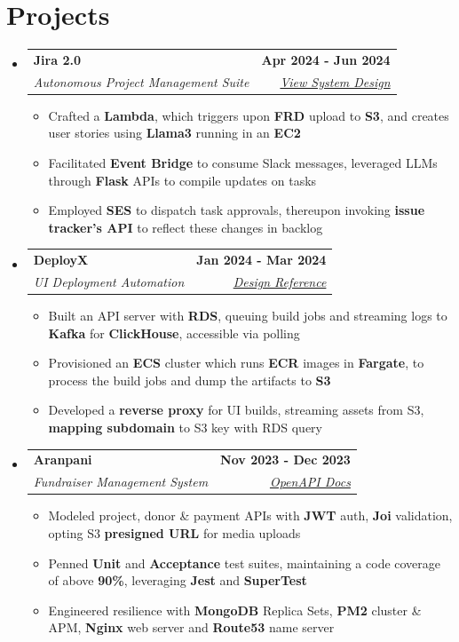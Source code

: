 \documentclass[letterpaper,11pt]{article}
\makeatletter
\newcommand{\resumeItem}[1]{
  \item\small{
    {#1 \vspace{-2pt}}
  }
}
\newcommand{\resumeSubheading}[4]{
  \vspace{-2pt}\item
    \begin{tabular*}{1.0\textwidth}[t]{l@{\extracolsep{\fill}}r}
      \textbf{#1} & \textbf{\small #2} \\
      \textit{\small#3} & \textit{\small #4} \\
    \end{tabular*}\vspace{-7pt}
}
\newcommand{\resumeSubHeadingListStart}{\begin{itemize}[leftmargin=0.0in, label={}]}
\newcommand{\resumeSubHeadingListEnd}{\end{itemize}}
\newcommand{\resumeItemListStart}{\begin{itemize}}
\newcommand{\resumeItemListEnd}{\end{itemize}\vspace{-5pt}}
\makeatother
\begin{document}
\section{Projects}
  \resumeSubHeadingListStart

    \resumeSubheading
      {Jira 2.0}{Apr 2024 - Jun 2024}
      {Autonomous Project Management Suite}{\href{https://gist.github.com/kr-aashish/5d1b184bb082b29c0534861d07c2f25a}{View System Design}}
      \resumeItemListStart
        \resumeItem{Crafted a \textbf{Lambda}, which triggers upon \textbf{FRD} upload to \textbf{S3}, and creates user stories using \textbf{Llama3} running in an \textbf{EC2}}
        \resumeItem{Facilitated \textbf{Event Bridge} to consume Slack messages, leveraged LLMs through \textbf{Flask} APIs to compile updates on tasks}
        \resumeItem{Employed \textbf{SES} to dispatch task approvals, thereupon invoking \textbf{issue tracker's API} to reflect these changes in backlog}
      \resumeItemListEnd

    \resumeSubheading
      {DeployX}{Jan 2024 - Mar 2024}
      {UI Deployment Automation}{\href{https://vercel.com/blog/behind-the-scenes-of-vercels-infrastructure}{Design Reference}}
      \resumeItemListStart
        \resumeItem{Built an API server with \textbf{RDS}, queuing build jobs and streaming logs to \textbf{Kafka} for \textbf{ClickHouse}, accessible via polling}
        \resumeItem{Provisioned an \textbf{ECS} cluster which runs \textbf{ECR} images in \textbf{Fargate}, to process the build jobs and dump the artifacts to \textbf{S3}}
        \resumeItem{Developed a \textbf{reverse proxy} for UI builds, streaming assets from S3, \textbf{mapping subdomain} to S3 key with RDS query}
      \resumeItemListEnd

    \resumeSubheading
      {Aranpani}{Nov 2023 - Dec 2023}
      {Fundraiser Management System}{\href{https://kr-aashish.github.io/aranpani-api-docs}{OpenAPI Docs}}
      \resumeItemListStart
        \resumeItem{Modeled project, donor \& payment APIs with \textbf{JWT} auth, \textbf{Joi} validation, opting S3 \textbf{presigned URL} for media uploads}
        \resumeItem{Penned \textbf{Unit} and \textbf{Acceptance} test suites, maintaining a code coverage of above \textbf{90\%}, leveraging \textbf{Jest} and \textbf{SuperTest}}
        \resumeItem{Engineered resilience with \textbf{MongoDB} Replica Sets, \textbf{PM2} cluster \& APM, \textbf{Nginx} web server and \textbf{Route53} name server}
      \resumeItemListEnd
    
  \resumeSubHeadingListEnd
\vspace{-16pt}
\end{document}
